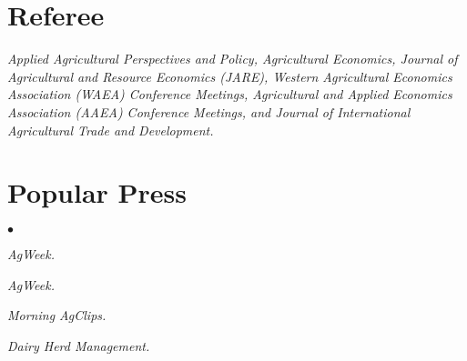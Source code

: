 \documentclass[margin,line]{res}
\newenvironment{list2}{
  \begin{list}{$\bullet$}{%
    \setlength{\itemsep}{0in}
    \setlength{\parsep}{0in} \setlength{\parskip}{0in}
    \setlength{\topsep}{0in} \setlength{\partopsep}{0in}
    \setlength{\leftmargin}{0.2in}}}{\end{list}}
\begin{document}
\begin{resume}
\section{\sc Referee}
\textit{Applied Agricultural Perspectives and Policy, Agricultural Economics, Journal of Agricultural and Resource Economics (JARE), Western Agricultural Economics Association (WAEA) Conference Meetings, Agricultural and Applied Economics Association (AAEA) Conference Meetings, and Journal of International Agricultural Trade and Development.}


\section{\sc Popular Press}
\begin{list2}
\item \href{http://agweek.com/business/agriculture/4496122-tariffs-india-china-hit-pulse-producers}{}\textit{AgWeek.}
\item \href{http://www.agweek.com/business/agriculture/4401264-spotlight-economics-nafta-renegotiation-and-issues-related-sweetener}{}\textit{AgWeek.}
\item \href{https://www.morningagclips.com/nafta-renegotiation-and-the-sweetener-trade/}{}\textit{Morning AgClips.}
\item \href{https://www.dairyherd.com/article/what-big-data-context-agriculture}{}\textit{Dairy Herd Management.}


\end{list2}



\end{resume}
\end{document}
